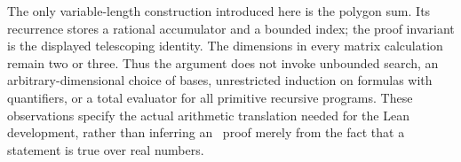 The only variable-length construction introduced here is the polygon sum.
Its recurrence stores a rational accumulator and a bounded index; the proof
invariant is the displayed telescoping identity. The dimensions in every
matrix calculation remain two or three. Thus the argument does not invoke
unbounded search, an arbitrary-dimensional choice of bases, unrestricted
induction on formulas with quantifiers, or a total evaluator for all primitive
recursive programs. These observations specify the actual arithmetic
translation needed for the Lean development, rather than inferring an
\ipra\ proof merely from the fact that a statement is true over real numbers.
